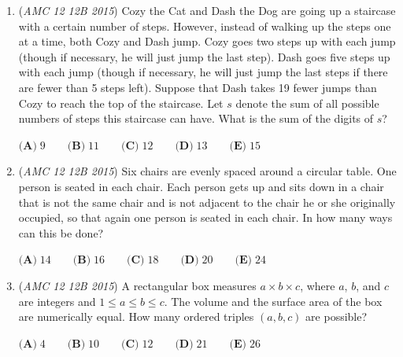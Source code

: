 \begin{enumerate}
 
 \[f(i,j) = \begin{cases}\text{mod}_5 (j+1) & \text{ if } i = 0 \text{ and } 0 \le j \le 4 \text{,}\\ f(i-1,1) & \text{ if } i \ge 1 \text{ and } j = 0 \text{, and} \\ f(i-1, f(i,j-1)) & \text{ if } i \ge 1 \text{ and } 1 \le j \le 4. \end{cases}\]


 What is $f(2015,2)$?


 $\textbf{(A)}\; 0 \qquad\textbf{(B)}\; 1 \qquad\textbf{(C)}\; 2 \qquad\textbf{(D)}\; 3 \qquad\textbf{(E)}\; 4$


	\item (\textit{AMC 12 12B 2015}) Cozy the Cat and Dash the Dog are going up a staircase with a certain number of steps. However, instead of walking up the steps one at a time, both Cozy and Dash jump. Cozy goes two steps up with each jump (though if necessary, he will just jump the last step). Dash goes five steps up with each jump (though if necessary, he will just jump the last steps if there are fewer than 5 steps left). Suppose that Dash takes 19 fewer jumps than Cozy to reach the top of the staircase. Let $s$ denote the sum of all possible numbers of steps this staircase can have. What is the sum of the digits of $s$?


 $\textbf{(A)}\; 9 \qquad\textbf{(B)}\; 11 \qquad\textbf{(C)}\; 12 \qquad\textbf{(D)}\; 13 \qquad\textbf{(E)}\; 15$


	\item (\textit{AMC 12 12B 2015}) Six chairs are evenly spaced around a circular table. One person is seated in each chair. Each person gets up and sits down in a chair that is not the same chair and is not adjacent to the chair he or she originally occupied, so that again one person is seated in each chair. In how many ways can this be done?


 $\textbf{(A)}\; 14 \qquad\textbf{(B)}\; 16 \qquad\textbf{(C)}\; 18 \qquad\textbf{(D)}\; 20 \qquad\textbf{(E)}\; 24$


	\item (\textit{AMC 12 12B 2015}) A rectangular box measures $a \times b \times c$, where $a$, $b$, and $c$ are integers and $1\leq a \leq b \leq c$. The volume and the surface area of the box are numerically equal. How many ordered triples $(a,b,c)$ are possible?


 $\textbf{(A)}\; 4 \qquad\textbf{(B)}\; 10 \qquad\textbf{(C)}\; 12 \qquad\textbf{(D)}\; 21 \qquad\textbf{(E)}\; 26$



\end{enumerate}

